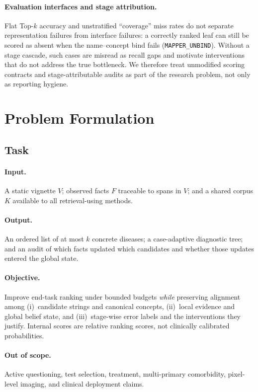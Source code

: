 \paragraph{Evaluation interfaces and stage attribution.}
Flat Top-$k$ accuracy and unstratified ``coverage'' miss rates do not separate representation failures from interface failures: a correctly ranked leaf can still be scored as absent when the name--concept bind fails (\texttt{MAPPER\_UNBIND}).
Without a stage cascade, such cases are misread as recall gaps and motivate interventions that do not address the true bottleneck.
We therefore treat unmodified scoring contracts and stage-attributable audits as part of the research problem, not only as reporting hygiene.

\section{Problem Formulation}
\label{sec:problem}

\subsection{Task}
\label{sec:task}

\paragraph{Input.}
A static vignette $V$; observed facts $F$ traceable to spans in $V$; and a shared corpus $K$ available to all retrieval-using methods.

\paragraph{Output.}
An ordered list of at most $k$ concrete diseases; a case-adaptive diagnostic tree; and an audit of which facts updated which candidates and whether those updates entered the global state.

\paragraph{Objective.}
Improve end-task ranking under bounded budgets \emph{while} preserving alignment among (i)~candidate strings and canonical concepts, (ii)~local evidence and global belief state, and (iii)~stage-wise error labels and the interventions they justify.
Internal scores are relative ranking scores, not clinically calibrated probabilities.

\paragraph{Out of scope.}
Active questioning, test selection, treatment, multi-primary comorbidity, pixel-level imaging, and clinical deployment claims.

